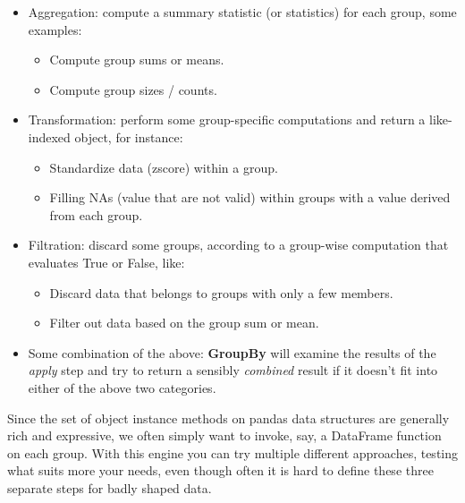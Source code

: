 \begin{itemize}
    \item Aggregation: compute a summary statistic (or statistics) for each group, some examples:
          \begin{itemize}
              \item Compute group sums or means.
              \item Compute group sizes / counts.
          \end{itemize}
    \item Transformation: perform some group-specific computations and return a like-indexed object, for instance:
          \begin{itemize}
              \item Standardize data (zscore) within a group.
              \item Filling NAs (value that are not valid) within groups with a value derived from each group.
          \end{itemize}
    \item Filtration: discard some groups, according to a group-wise computation that evaluates True or False, like:
          \begin{itemize}
              \item Discard data that belongs to groups with only a few members.
              \item Filter out data based on the group sum or mean.
          \end{itemize}
    \item Some combination of the above: \textbf{GroupBy} will examine the results of the \textit{apply} step and try to return a sensibly \textit{combined} result if it doesn't fit into either of the above two categories.
\end{itemize}
Since the set of object instance methods on pandas data structures are generally rich and expressive, we often simply want to invoke, say, a DataFrame function on each group.
With this engine you can try multiple different approaches, testing what suits more your needs, even though often it is hard to define these three separate steps for badly shaped data.

